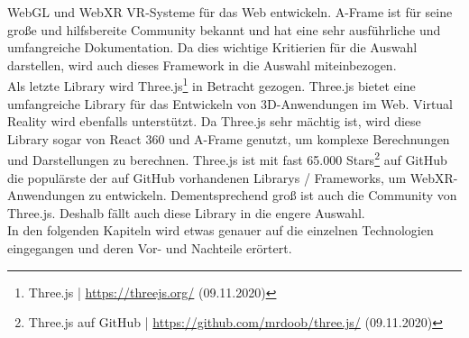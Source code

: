 \documentclass[a4paper,12pt,oneside]{article}
\begin{document}
      WebGL und WebXR VR-Systeme für das Web entwickeln. A-Frame ist für seine große und
      hilfsbereite Community bekannt und hat eine sehr ausführliche und umfangreiche
      Dokumentation. Da dies wichtige Kritierien für die Auswahl darstellen, wird auch
      dieses Framework in die Auswahl miteinbezogen.\\
      Als letzte Library wird Three.js\footnote{Three.js | \url{https://threejs.org/} (09.11.2020)}
      in Betracht gezogen. Three.js bietet eine umfangreiche
      Library für das Entwickeln von 3D-Anwendungen im Web. Virtual Reality wird ebenfalls
      unterstützt. Da Three.js sehr mächtig ist, wird diese Library sogar von React 360
      und A-Frame genutzt, um komplexe Berechnungen und Darstellungen zu berechnen.
      Three.js ist mit fast 65.000 Stars\footnote{Three.js auf GitHub | \url{https://github.com/mrdoob/three.js/} (09.11.2020)}
      auf GitHub die populärste der auf GitHub 
      vorhandenen Librarys / Frameworks, um WebXR-Anwendungen zu entwickeln. Dementsprechend
      groß ist auch die Community von Three.js. Deshalb fällt auch diese Library in
      die engere Auswahl.\\
      In den folgenden Kapiteln wird etwas genauer auf die einzelnen Technologien 
      eingegangen und deren Vor- und Nachteile erörtert.
\end{document}
